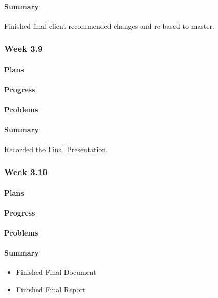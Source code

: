 \documentclass[onecolumn, draftclsnofoot,10pt, compsoc]{article}
\begin{document}
		    \paragraph{Summary} \hfill \break
		        Finished final client recommended changes and re-based to master.

		\subsubsection{Week 3.9}
		    \paragraph{Plans} \hfill \break
		    \paragraph{Progress} \hfill \break
		    \paragraph{Problems} \hfill \break
		    \paragraph{Summary} \hfill \break
		        Recorded the Final Presentation.

		\subsubsection{Week 3.10}
		    \paragraph{Plans} \hfill \break

		    \paragraph{Progress} \hfill \break

		    \paragraph{Problems} \hfill \break

		    \paragraph{Summary} \hfill \break
		    	\begin{itemize}
                    \item Finished Final Document
                    \item Finished Final Report
                \end{itemize}
\end{document}
